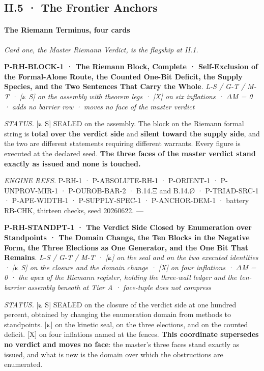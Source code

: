 \documentclass[10pt,twocolumn]{article}
\begin{document}
\hypertarget{ii.5-the-frontier-anchors}{%
\subsection{II.5 · The Frontier
Anchors}\label{ii.5-the-frontier-anchors}}

\hypertarget{the-riemann-terminus-four-cards}{%
\paragraph{The Riemann Terminus, four
cards}\label{the-riemann-terminus-four-cards}}

\emph{Card one, the Master Riemann Verdict, is the flagship at II.1.}

\textbf{P-RH-BLOCK-1 · The Riemann Block, Complete · Self-Exclusion of
the Formal-Alone Route, the Counted One-Bit Deficit, the Supply Species,
and the Two Sentences That Carry the Whole}. \emph{L-S / G-T / M-T ·
{[}⟀ S{]} on the assembly with theorem legs · {[}X{]} on six inflations
· ΔM = 0 · adds no barrier row · moves no face of the master verdict}

\emph{STATUS.} {[}⟀ S{]} SEALED on the assembly. The block on the
Riemann formal string is \textbf{total over the verdict side} and
\textbf{silent toward the supply side}, and the two are different
statements requiring different warrants. Every figure is executed at the
declared seed. \textbf{The three faces of the master verdict stand
exactly as issued and none is touched.}

\emph{ENGINE REFS.} P-RH-1 · P-ABSOLUTE-RH-1 · P-ORIENT-1 ·
P-UNPROV-MIR-1 · P-OUROB-BAR-2 · B.14.Ξ and B.14.Ø · P-TRIAD-SRC-1 ·
P-APE-WIDTH-1 · P-SUPPLY-SPEC-1 · P-ANCHOR-DEM-1 · battery RB-CHK,
thirteen checks, seed 20260622. ---

\textbf{P-RH-STANDPT-1 · The Verdict Side Closed by Enumeration over
Standpoints · The Domain Change, the Ten Blocks in the Negative Form,
the Three Elections as One Generator, and the One Bit That Remains}.
\emph{L-S / G-T / M-T · {[}⟀{]} on the seal and on the two executed
identities · {[}⟀ S{]} on the closure and the domain change · {[}X{]} on
four inflations · ΔM = 0 · the apex of the Riemann register, holding the
three-wall ledger and the ten-barrier assembly beneath at Tier A ·
face-tuple does not compress}

\emph{STATUS.} {[}⟀ S{]} SEALED on the closure of the verdict side at
one hundred percent, obtained by changing the enumeration domain from
methods to standpoints. {[}⟀{]} on the kinetic seal, on the three
elections, and on the counted deficit. {[}X{]} on four inflations named
at the fences. \textbf{This coordinate supersedes no verdict and moves
no face}: the master's three faces stand exactly as issued, and what is
new is the domain over which the obstructions are enumerated.
\end{document}
